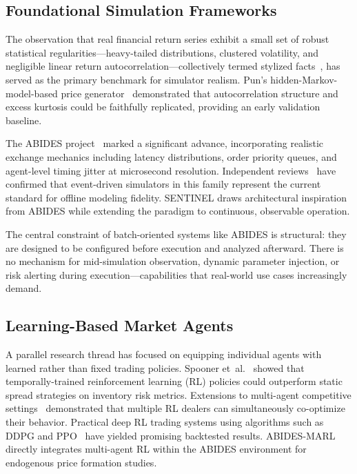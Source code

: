 \documentclass[conference]{IEEEtran}
\begin{document}
\subsection{Foundational Simulation Frameworks}

The observation that real financial return series exhibit a small set
of robust statistical regularities---heavy-tailed distributions,
clustered volatility, and negligible linear return
autocorrelation---collectively termed stylized facts~\cite{ref9}, has
served as the primary benchmark for simulator realism. Pun's
hidden-Markov-model-based price generator~\cite{ref19} demonstrated
that autocorrelation structure and excess kurtosis could be
faithfully replicated, providing an early validation baseline.

The ABIDES project~\cite{ref5}\cite{ref11} marked a significant
advance, incorporating realistic exchange mechanics including latency
distributions, order priority queues, and agent-level timing jitter
at microsecond resolution. Independent reviews~\cite{ref6} have
confirmed that event-driven simulators in this family represent the
current standard for offline modeling fidelity. SENTINEL draws
architectural inspiration from ABIDES while extending the paradigm to
continuous, observable operation.

The central constraint of batch-oriented systems like ABIDES is
structural: they are designed to be configured before execution and
analyzed afterward. There is no mechanism for mid-simulation
observation, dynamic parameter injection, or risk alerting during
execution---capabilities that real-world use cases increasingly
demand.

\subsection{Learning-Based Market Agents}

A parallel research thread has focused on equipping individual agents
with learned rather than fixed trading policies. Spooner
et~al.~\cite{ref8} showed that temporally-trained reinforcement
learning (RL) policies could outperform static spread strategies on
inventory risk metrics. Extensions to multi-agent competitive
settings~\cite{ref7} demonstrated that multiple RL dealers can
simultaneously co-optimize their behavior. Practical deep RL trading
systems using algorithms such as DDPG and PPO~\cite{ref3}\cite{ref16}
have yielded promising backtested results. ABIDES-MARL~\cite{ref4}
directly integrates multi-agent RL within the ABIDES environment for
endogenous price formation studies.
\end{document}
